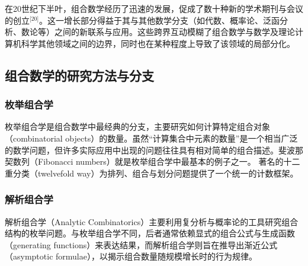 在20世纪下半叶，组合数学经历了迅速的发展，促成了数十种新的学术期刊与会议的创立\(^\text{[20]}\)。这一增长部分得益于其与其他数学分支（如代数、概率论、泛函分析、数论等）之间的新联系与应用。这些跨界互动模糊了组合数学与数学及理论计算机科学其他领域之间的边界，同时也在某种程度上导致了该领域的局部分化。
\subsection{组合数学的研究方法与分支}
\subsubsection{枚举组合学}
枚举组合学是组合数学中最经典的分支，主要研究如何计算特定组合对象（combinatorial objects）的数量。虽然“计算集合中元素的数量”是一个相当广泛的数学问题，但许多实际应用中出现的问题往往具有相对简单的组合描述。斐波那契数列（Fibonacci numbers）就是枚举组合学中最基本的例子之一。  著名的十二重分类（twelvefold way）为排列、组合与划分问题提供了一个统一的计数框架。
\subsubsection{解析组合学}
解析组合学（Analytic Combinatorics）主要利用复分析与概率论的工具研究组合结构的枚举问题。与枚举组合学不同，后者通常依赖显式的组合公式与生成函数（generating functions）来表达结果，而解析组合学则旨在推导出渐近公式（asymptotic formulae），以揭示组合数量随规模增长时的行为规律。

